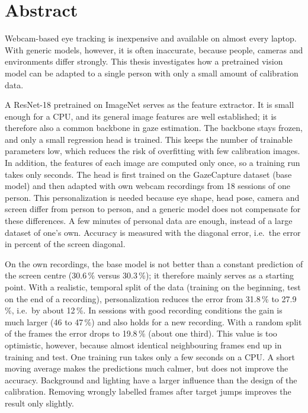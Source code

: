 
\BHTTitelseite


\chapter*{Abstract}
Webcam-based eye tracking is inexpensive and available on almost every laptop.
With generic models, however, it is often inaccurate, because people, cameras
and environments differ strongly. This thesis investigates how a pretrained
vision model can be adapted to a single person with only a small amount of
calibration data.

A ResNet-18 pretrained on ImageNet serves as the feature extractor. It is small
enough for a CPU, and its general image features are well established; it is
therefore also a common backbone in gaze estimation. The backbone stays frozen,
and only a small regression head is trained. This keeps the number of trainable
parameters low, which reduces the risk of overfitting with few calibration
images. In addition, the features of each image are computed only once, so a
training run takes only seconds. The head is first trained on the GazeCapture
dataset (base model) and then adapted with own webcam recordings from 18
sessions of one person. This personalization is needed because eye shape, head
pose, camera and screen differ from person to person, and a generic model does
not compensate for these differences. A few minutes of personal data are
enough, instead of a large dataset of one's own. Accuracy is measured with the
diagonal error, i.e.\ the error in percent of the screen diagonal.

On the own recordings, the base model is not better than a constant prediction
of the screen centre (30.6\,\% versus 30.3\,\%); it therefore mainly serves as
a starting point. With a realistic, temporal split of the data (training on the
beginning, test on the end of a recording), personalization reduces the error
from 31.8\,\% to 27.9\,\%, i.e.\ by about 12\,\%. In sessions with good
recording conditions the gain is much larger (46 to 47\,\%) and also holds for
a new recording. With a random split of the frames the error drops to
19.8\,\% (about one third). This value is too optimistic, however, because
almost identical neighbouring frames end up in training and test. One training
run takes only a few seconds on a CPU. A short moving average makes the
predictions much calmer, but does not improve the accuracy. Background and
lighting have a larger influence than the design of the calibration. Removing wrongly labelled frames after target jumps
improves the result only slightly.

